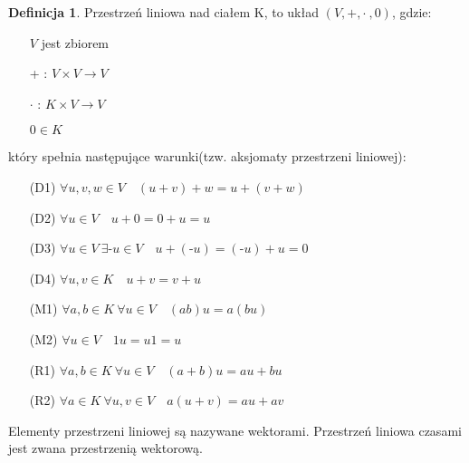 \documentclass[12pt,a4paper]{article}
\theoremstyle{plain}
\theoremstyle{definition}
\theoremstyle{definition}
\newtheorem{df}{Definicja}[section]
\theoremstyle{definition}
\theoremstyle{definition}
\theoremstyle{definition}
\theoremstyle{definition}
\theoremstyle{definition}
\theoremstyle{definition}
\begin{document}
\begin{df}
Przestrzeń liniowa nad ciałem K, to układ $(V,+,\cdot\ ,0)$, gdzie:
\begin{itemize} 
        \item[] $V$ jest zbiorem
        \item[+]: $V \times V \rightarrow V$
        \item[$\cdot$]: $K \times V \rightarrow V$
        \item[] $0 \in K$ 
    \end{itemize} 
    który spełnia następujące warunki(tzw. aksjomaty przestrzeni liniowej): 
    \begin{itemize}
        \item[(D1)] $\forall u, v, w \in V \quad (u+v)+w = u + (v+w)$
        \item[(D2)] $\forall u \in V \quad u+0 = 0+u = u$
        \item[(D3)] $\forall u \in V \ \exists \text{-}u \in V \quad u + (\text{-}u) = (\text{-}u) + u = 0$
        \item[(D4)] $\forall u, v \in K \quad u+v = v+u$
        \item[(M1)] $\forall a, b \in K\  \forall u \in V \quad (ab)u = a(bu) $
        \item[(M2)] $\forall u \in V \quad 1u = u1 = u$
        \item[(R1)] $ \forall a,b \in K\ \forall u \in V \quad (a+b)u = au + bu $
        \item[(R2)] $ \forall a \in K\ \forall u,v \in V \quad a(u+v) = au + av $
    \end{itemize}
    \vspace{5mm}
    Elementy przestrzeni liniowej są nazywane wektorami. 
    Przestrzeń liniowa czasami jest zwana przestrzenią wektorową.
\end{df}
\end{document}
